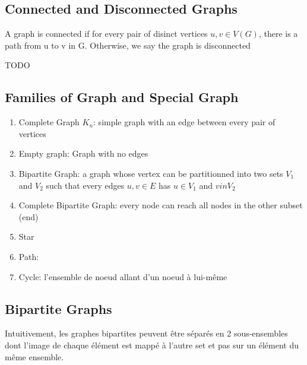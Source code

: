 \documentclass{article}
\begin{document}
\subsection{Connected and Disconnected Graphs}%
\label{sub:Connected Graphs}

\begin{definition}
    A graph is connected if for every pair of disinct vertices $ u,v \in
    V(G)$, there is a path from u to v in G. Otherwise, we say the
    graph is disconnected
\end{definition}

\begin{definition}

\end{definition}


\begin{definition}
    TODO
\end{definition}

\subsection{Families of Graph and Special Graph}%
\label{sub:Families of Graph and Special Graph}

\begin{enumerate}
    \item Complete Graph $K_n$: simple graph with an edge between every
	pair of vertices
    \item Empty graph: Graph with no edges
    \item Bipartite Graph: a graph whose vertex can be partitionned into
	two sets $V_1$ and $V_2$ such that every edges $ u,v \in E$ has
	$u \in V_1$ and $v in V_2$
    \item Complete Bipartite Graph: every node can reach all nodes in
	the other subset (end)
    \item Star
    \item Path:
    \item Cycle: l'ensemble de noeud allant d'un noeud à lui-même
\end{enumerate}

\subsection{Bipartite Graphs}%
\label{sub:Bipartite Graphs}

\begin{remark}
    Intuitivement, les graphes bipartites peuvent être séparés en 2
    sous-ensembles dont l'image de chaque élément est mappé à l'autre
    set et pas sur un élément du même ensemble.
\end{remark}
\end{document}
